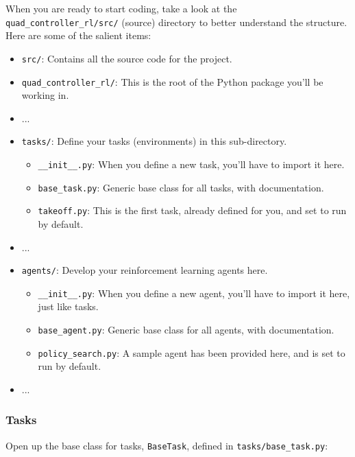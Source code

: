 \documentclass[11pt]{article}
\providecommand{\tightlist}{%
      \setlength{\itemsep}{0pt}\setlength{\parskip}{0pt}}
\begin{document}
When you are ready to start coding, take a look at the
\texttt{quad\_controller\_rl/src/} (source) directory to better
understand the structure. Here are some of the salient items:

\begin{itemize}
\tightlist
\item
  \texttt{src/}: Contains all the source code for the project.
\item
  \texttt{quad\_controller\_rl/}: This is the root of the Python package
  you'll be working in.
\item
  ...
\item
  \texttt{tasks/}: Define your tasks (environments) in this
  sub-directory.

  \begin{itemize}
  \tightlist
  \item
    \texttt{\_\_init\_\_.py}: When you define a new task, you'll have to
    import it here.
  \item
    \texttt{base\_task.py}: Generic base class for all tasks, with
    documentation.
  \item
    \texttt{takeoff.py}: This is the first task, already defined for
    you, and set to run by default.
  \end{itemize}
\item
  ...
\item
  \texttt{agents/}: Develop your reinforcement learning agents here.

  \begin{itemize}
  \tightlist
  \item
    \texttt{\_\_init\_\_.py}: When you define a new agent, you'll have
    to import it here, just like tasks.
  \item
    \texttt{base\_agent.py}: Generic base class for all agents, with
    documentation.
  \item
    \texttt{policy\_search.py}: A sample agent has been provided here,
    and is set to run by default.
  \end{itemize}
\item
  ...
\end{itemize}

\subsubsection{Tasks}\label{tasks}

Open up the base class for tasks, \texttt{BaseTask}, defined in
\texttt{tasks/base\_task.py}:
\end{document}
